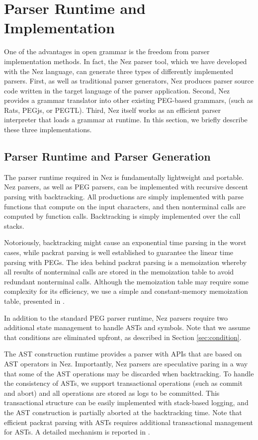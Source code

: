 \documentclass[preprint]{sigplanconf}
\begin{document}
{{{\section{Parser Runtime and Implementation} \label{sec:impl}

One of the advantages in open grammar is the freedom from parser implementation methods. In fact, the Nez parser tool, which we have developed with the Nez language, can generate three types of differently implemented parsers. First, as well as traditional parser generators, Nez produces parser source code written in the target language of the parser application. Second, Nez provides a grammar translator into other existing PEG-based grammars, (such as Rats, PEGjs, or PEGTL). Third, Nez itself works as an efficient parser interpreter that loads a grammar at runtime. In this section, we briefly describe these three implementations. 

\subsection{Parser Runtime and Parser Generation} 

The parser runtime required in Nez is fundamentally lightweight and portable. Nez parsers, as well as PEG parsers, can be implemented with recursive descent parsing with backtracking. All productions are simply implemented with parse functions that compute on the input characters, and then nonterminal calls are computed by function calls. Backtracking is simply implemented over the call stacks. 

Notoriously, backtracking might cause an exponential time parsing in the worst cases, while packrat parsing\cite{ICFP02_PackratParsing} is well established to guarantee the linear time parsing with PEGs. The idea behind packrat parsing is a memoization whereby  all results of nonterminal calls are stored in the memoization table to avoid redundant nonterminal calls. Although the memoization table may require some complexity for its efficiency,  we use a simple and constant-memory memoization table, presented in \cite{PRO101}. 

In addition to the standard PEG parser runtime, Nez parsers require two additional state management to handle ASTs and symbols. Note that we assume that conditions are eliminated upfront, as described in Section \ref{sec:condition}. 

The AST construction runtime provides a parser with APIs that are based on AST operators in Nez. Importantly, Nez parsers are speculative paring in a way that some of the AST operations may be discarded when backtracking. To handle the consistency of ASTs, we support  transactional operations (such as {\sf commit} and {\sf abort}) and all operations are stored as logs to be committed. This transactional structure can be easily implemented with stack-based logging, and the AST construction is partially aborted at the backtracking time. Note that efficient packrat parsing with ASTs requires additional transactional management for ASTs. A detailed mechanism is reported in \cite{ASTMachine}.

}}}
\end{document}
